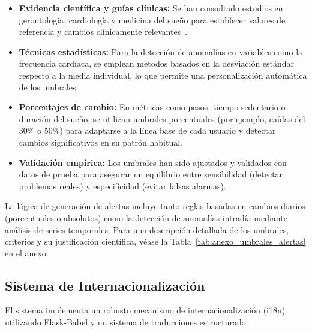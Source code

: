 \begin{itemize}
    \item \textbf{Evidencia científica y guías clínicas:} Se han consultado estudios en gerontología, cardiología y medicina del sueño para establecer valores de referencia y cambios clínicamente relevantes~\cite{Smith2019, Owen2020, Irwin2015}.
    \item \textbf{Técnicas estadísticas:} Para la detección de anomalías en variables como la frecuencia cardíaca, se emplean métodos basados en la desviación estándar respecto a la media individual, lo que permite una personalización automática de los umbrales.
    \item \textbf{Porcentajes de cambio:} En métricas como pasos, tiempo sedentario o duración del sueño, se utilizan umbrales porcentuales (por ejemplo, caídas del 30\% o 50\%) para adaptarse a la línea base de cada usuario y detectar cambios significativos en su patrón habitual.
    \item \textbf{Validación empírica:} Los umbrales han sido ajustados y validados con datos de prueba para asegurar un equilibrio entre sensibilidad (detectar problemas reales) y especificidad (evitar falsas alarmas).
\end{itemize}

La lógica de generación de alertas incluye tanto reglas basadas en cambios diarios (porcentuales o absolutos) como la detección de anomalías intradía mediante análisis de series temporales. Para una descripción detallada de los umbrales, criterios y su justificación científica, véase la Tabla~\ref{tab:anexo_umbrales_alertas} en el anexo.

\subsection{Sistema de Internacionalización}
\label{subsec:impl_i18n}

El sistema implementa un robusto mecanismo de internacionalización (i18n) utilizando Flask-Babel y un sistema de traducciones estructurado:

